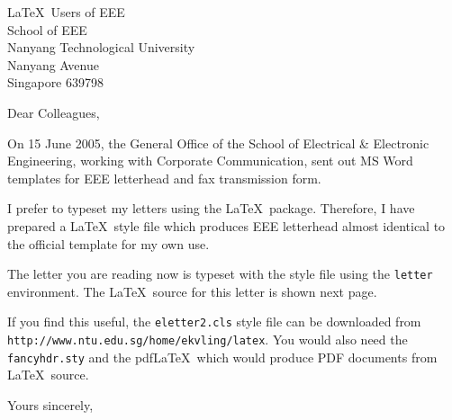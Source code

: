 \documentclass[12pt,a4paper]{eletter2}
\date{\today}
\begin{document}
 \begin{letter}{
 \LaTeX\ Users of EEE\\
 School of EEE \\
 Nanyang Technological University \\
 Nanyang Avenue \\
 Singapore 639798}

 \opening{Dear Colleagues,}

 \medskip

On 15 June 2005, the General Office of the School of Electrical \&
Electronic Engineering, working with Corporate Communication, sent
out MS Word templates for EEE letterhead and fax transmission
form.

I prefer to typeset my letters using the \LaTeX\ package.
Therefore, I have prepared a \LaTeX\ style file which produces EEE
letterhead almost identical to the official template for my own
use.

The letter you are reading now is typeset with the style file
using the {\tt letter} environment. The \LaTeX\ source for this
letter is shown next page.

If you find this useful, the {\tt eletter2.cls} style file can be
downloaded from \\
{\tt http://www.ntu.edu.sg/home/ekvling/latex}. You would also
need the {\tt fancyhdr.sty} and the pdf\LaTeX\ which would produce
PDF documents from \LaTeX\ source.

 \closing{Yours sincerely,}

 \end{letter}

\newpage
\end{document}
